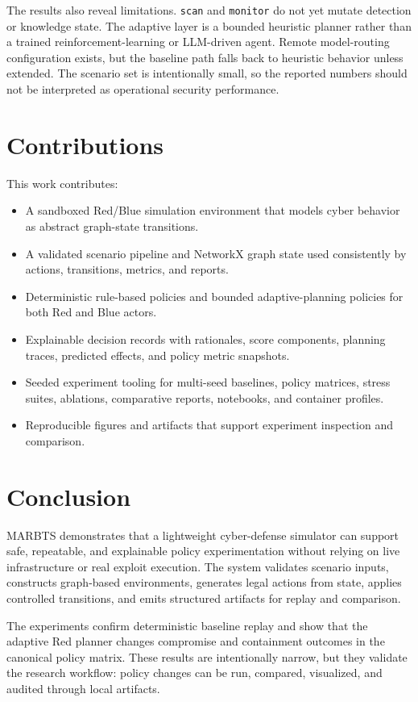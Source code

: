 \documentclass[conference]{IEEEtran}
\begin{document}
The results also reveal limitations. \texttt{scan} and \texttt{monitor} do not yet mutate detection or knowledge state. The adaptive layer is a bounded heuristic planner rather than a trained reinforcement-learning or LLM-driven agent. Remote model-routing configuration exists, but the baseline path falls back to heuristic behavior unless extended. The scenario set is intentionally small, so the reported numbers should not be interpreted as operational security performance.

\section{Contributions}
This work contributes:

\begin{itemize}
    \item A sandboxed Red/Blue simulation environment that models cyber behavior as abstract graph-state transitions.
    \item A validated scenario pipeline and NetworkX graph state used consistently by actions, transitions, metrics, and reports.
    \item Deterministic rule-based policies and bounded adaptive-planning policies for both Red and Blue actors.
    \item Explainable decision records with rationales, score components, planning traces, predicted effects, and policy metric snapshots.
    \item Seeded experiment tooling for multi-seed baselines, policy matrices, stress suites, ablations, comparative reports, notebooks, and container profiles.
    \item Reproducible figures and artifacts that support experiment inspection and comparison.
\end{itemize}

\section{Conclusion}
MARBTS demonstrates that a lightweight cyber-defense simulator can support safe, repeatable, and explainable policy experimentation without relying on live infrastructure or real exploit execution. The system validates scenario inputs, constructs graph-based environments, generates legal actions from state, applies controlled transitions, and emits structured artifacts for replay and comparison.

The experiments confirm deterministic baseline replay and show that the adaptive Red planner changes compromise and containment outcomes in the canonical policy matrix. These results are intentionally narrow, but they validate the research workflow: policy changes can be run, compared, visualized, and audited through local artifacts.
\end{document}
